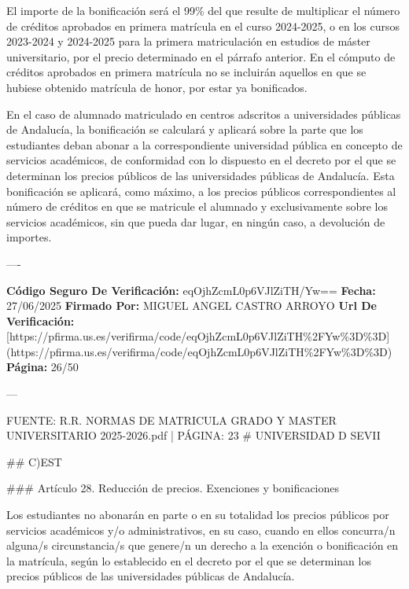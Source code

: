 \documentclass{article}
\begin{document}
\begin{itemize}
\begin{itemize}
\begin{scriptsize}
                  El importe de la bonificación será el 99\% del que resulte de multiplicar el número de créditos aprobados en primera matrícula en el curso 2024-2025, o en los cursos 2023-2024 y 2024-2025 para la primera matriculación en estudios de máster universitario, por el precio determinado en el párrafo anterior. En el cómputo de créditos aprobados en primera matrícula no se incluirán aquellos en que se hubiese obtenido matrícula de honor, por estar ya bonificados.

                  En el caso de alumnado matriculado en centros adscritos a universidades públicas de Andalucía, la bonificación se calculará y aplicará sobre la parte que los estudiantes deban abonar a la correspondiente universidad pública en concepto de servicios académicos, de conformidad con lo dispuesto en el decreto por el que se determinan los precios públicos de las universidades públicas de Andalucía. Esta bonificación se aplicará, como máximo, a los precios públicos correspondientes al número de créditos en que se matricule el alumnado y exclusivamente sobre los servicios académicos, sin que pueda dar lugar, en ningún caso, a devolución de importes.

                  ----

                  \textbf{Código Seguro De Verificación:} eqOjhZcmL0p6VJlZiTH/Yw==
                  \textbf{Fecha:} 27/06/2025
                  \textbf{Firmado Por:} MIGUEL ANGEL CASTRO ARROYO
                  \textbf{Url De Verificación:} [https://pfirma.us.es/verifirma/code/eqOjhZcmL0p6VJlZiTH\%2FYw\%3D\%3D](https://pfirma.us.es/verifirma/code/eqOjhZcmL0p6VJlZiTH\%2FYw\%3D\%3D)
                  \textbf{Página:} 26/50

                  ---

                  FUENTE: R.R. NORMAS DE MATRICULA GRADO Y MASTER UNIVERSITARIO 2025-2026.pdf | PÁGINA: 23
                  \# UNIVERSIDAD D SEVII

                  \#\# C)EST

                  \#\#\# Artículo 28. Reducción de precios. Exenciones y bonificaciones

                  Los estudiantes no abonarán en parte o en su totalidad los precios públicos por servicios académicos y/o administrativos, en su caso, cuando en ellos concurra/n alguna/s circunstancia/s que genere/n un derecho a la exención o bonificación en la matrícula, según lo establecido en el decreto por el que se determinan los precios públicos de las universidades públicas de Andalucía.


\end{scriptsize}
\end{itemize}
\end{itemize}
\end{document}
